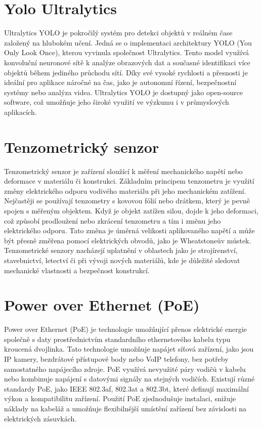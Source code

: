 \section{Yolo Ultralytics}\label{sec:yolo-ultralytics}
Ultralytics YOLO je pokročilý systém pro detekci objektů v reálném čase založený na hlubokém učení. Jedná se o implementaci architektury YOLO (You Only Look Once), kterou vyvinula společnost Ultralytics. Tento model využívá konvoluční neuronové sítě k analýze obrazových dat a současné identifikaci více objektů během jediného průchodu sítí. Díky své vysoké rychlosti a přesnosti je ideální pro aplikace náročné na čas, jako je autonomní řízení, bezpečnostní systémy nebo analýza videa. Ultralytics YOLO je dostupný jako open-source software, což umožňuje jeho široké využití ve výzkumu i v průmyslových aplikacích.


\section{Tenzometrický senzor}\label{sec:tenzo}
Tenzometrický senzor je zařízení sloužící k měření mechanického napětí nebo deformace v materiálu či konstrukci. Základním principem tenzometru je využití změny elektrického odporu vodivého materiálu při jeho mechanickém zatížení. Nejčastěji se používají tenzometry s kovovou fólií nebo drátkem, který je pevně spojen s měřeným objektem. Když je objekt zatížen silou, dojde k jeho deformaci, což způsobí prodloužení nebo zkrácení tenzometru a tím i změnu jeho elektrického odporu. Tato změna je úměrná velikosti aplikovaného napětí a může být přesně změřena pomocí elektrických obvodů, jako je Wheatstoneův můstek. Tenzometrické senzory nacházejí uplatnění v oblastech jako je strojírenství, stavebnictví, letectví či při vývoji nových materiálů, kde je důležité sledovat mechanické vlastnosti a bezpečnost konstrukcí.


\section{Power over Ethernet (PoE)}\label{sec:poe}
Power over Ethernet (PoE) je technologie umožňující přenos elektrické energie společně s daty prostřednictvím standardního ethernetového kabelu typu kroucená dvojlinka. Tato technologie umožňuje napájet síťová zařízení, jako jsou IP kamery, bezdrátové přístupové body nebo VoIP telefony, bez potřeby samostatného napájecího zdroje. PoE využívá nevyužité páry vodičů v kabelu nebo kombinuje napájení s datovými signály na stejných vodičích. Existují různé standardy PoE, jako IEEE 802.3af, 802.3at a 802.3bt, které definují maximální výkon a kompatibilitu zařízení. Použití PoE zjednodušuje instalaci, snižuje náklady na kabeláž a umožňuje flexibilnější umístění zařízení bez závislosti na elektrických zásuvkách.



